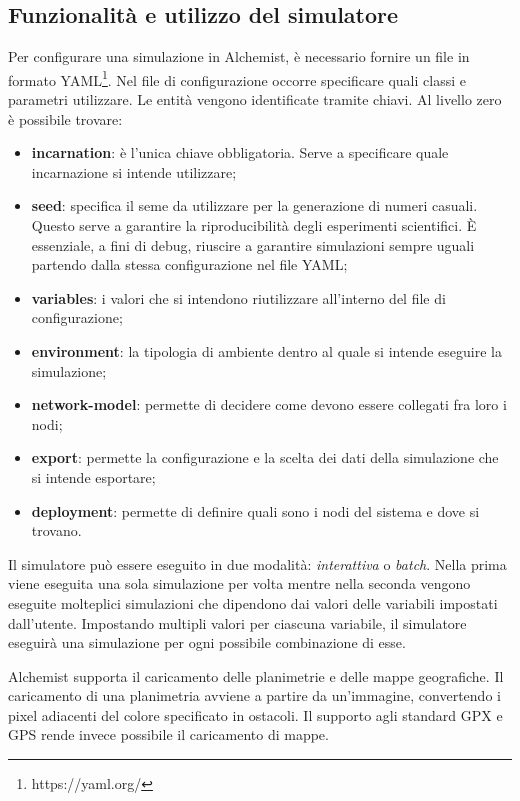 \documentclass[12pt,a4paper,openright,twoside]{book}
\begin{document}
\subsection{Funzionalità e utilizzo del simulatore}
Per configurare una simulazione in Alchemist, è necessario fornire un file in formato YAML\footnote{https://yaml.org/}. Nel file di configurazione occorre specificare quali classi e parametri utilizzare. Le entità vengono identificate tramite chiavi. Al livello zero è possibile trovare: 
\begin{itemize}
    \item \textbf{incarnation}: è l'unica chiave obbligatoria. Serve a specificare quale incarnazione si intende utilizzare; 
    \item \textbf{seed}: specifica il seme da utilizzare per la generazione di numeri casuali. Questo serve a garantire la riproducibilità degli esperimenti scientifici. È essenziale, a fini di debug, riuscire a garantire simulazioni sempre uguali partendo dalla stessa configurazione nel file YAML;
    \item \textbf{variables}: i valori che si intendono riutilizzare all'interno del file di configurazione;
    \item \textbf{environment}: la tipologia di ambiente dentro al quale si intende eseguire la simulazione;
    \item \textbf{network-model}: permette di decidere come devono essere collegati fra loro i nodi;
    \item \textbf{export}: permette la configurazione e la scelta dei dati della simulazione che si intende esportare; 
    \item \textbf{deployment}: permette di definire quali sono i nodi del sistema e dove si trovano. 
\end{itemize}
Il simulatore può essere eseguito in due modalità: \textit{interattiva} o \textit{batch}. Nella prima viene eseguita una sola simulazione per volta mentre nella seconda vengono eseguite molteplici simulazioni che dipendono dai valori delle variabili impostati dall'utente. Impostando multipli valori per ciascuna variabile, il simulatore eseguirà una simulazione per ogni possibile combinazione di esse. 

Alchemist supporta il caricamento delle planimetrie e delle mappe geografiche. Il caricamento di una planimetria avviene a partire da un'immagine, convertendo i pixel adiacenti del colore specificato in ostacoli. Il supporto agli standard GPX e GPS rende invece possibile il caricamento di mappe. 
\end{document}
